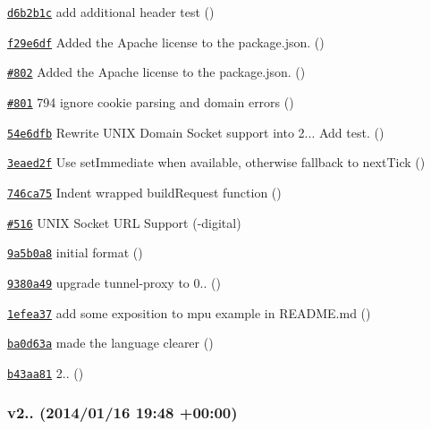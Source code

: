 \begin{DoxyItemize}
\item \href{https://github.com/mikeal/request/commit/d6b2b1c279d12cdddc6593060672d49b12e63fea}{\tt d6b2b1c} add additional header test ()
\item \href{https://github.com/mikeal/request/commit/f29e6dfadc6c3a45b6190998b6608059f87f3c32}{\tt f29e6df} Added the Apache license to the package.\+json. ()
\item \href{https://github.com/mikeal/request/pull/802}{\tt \#802} Added the Apache license to the package.\+json. ()
\item \href{https://github.com/mikeal/request/pull/801}{\tt \#801} 794 ignore cookie parsing and domain errors ()
\item \href{https://github.com/mikeal/request/commit/54e6dfb77d57757d4006982f813ebaab9e005cd5}{\tt 54e6dfb} Rewrite U\+N\+I\+X Domain Socket support into 2... Add test. ()
\item \href{https://github.com/mikeal/request/commit/3eaed2f2e82d9d17a583bcc54270c16a7b674206}{\tt 3eaed2f} Use set\+Immediate when available, otherwise fallback to next\+Tick ()
\item \href{https://github.com/mikeal/request/commit/746ca757da24d5011e92e04cb00c90098a7680fd}{\tt 746ca75} Indent wrapped build\+Request function ()
\item \href{https://github.com/mikeal/request/pull/516}{\tt \#516} U\+N\+I\+X Socket U\+R\+L Support (-\/digital)
\item \href{https://github.com/mikeal/request/commit/9a5b0a81eca9836f05b0192c05c0d41e79034461}{\tt 9a5b0a8} initial format ()
\item \href{https://github.com/mikeal/request/commit/9380a49779ddb081eba5d0ee51e4396d72d52066}{\tt 9380a49} upgrade tunnel-\/proxy to 0.. ()
\item \href{https://github.com/mikeal/request/commit/1efea374286c728c3c988ee2264fb44cd8c41d88}{\tt 1efea37} add some exposition to mpu example in R\+E\+A\+D\+M\+E.\+md ()
\item \href{https://github.com/mikeal/request/commit/ba0d63ae23a3fc95dfe012df0bd6c8d7e87b1df7}{\tt ba0d63a} made the language clearer ()
\item \href{https://github.com/mikeal/request/commit/b43aa81789c0b8c7ae90d2b983f79dde4a125470}{\tt b43aa81} 2.. ()
\end{DoxyItemize}

\subsubsection*{v2.. (2014/01/16 19\+:48 +00\+:00)}



